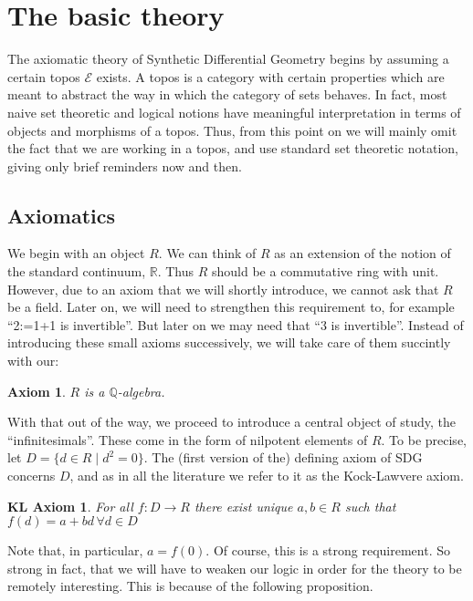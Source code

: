 \documentclass[11pt]{article}
\newtheorem{axiom}{Axiom}[section]
\newtheorem{klaxiom}{KL Axiom}
\theoremstyle{definition}
\newcommand{\sdgE}{\mathcal{E}}
\newcommand{\Q}{\mathbb{Q}}
\numberwithin{equation}{section}
\begin{document}
\section{The basic theory}

The axiomatic theory of Synthetic Differential Geometry begins by assuming a certain topos \( \sdgE \) exists. A topos is a category with certain properties which are meant to abstract the way in which the category of sets behaves. In fact, most naive set theoretic and logical notions have meaningful interpretation in terms of objects and morphisms of a topos. Thus, from this point on we will mainly omit the fact that we are working in a topos, and use standard set theoretic notation, giving only brief reminders now and then. 

\subsection{Axiomatics}

We begin with an object \( R \). We can think of \( R \) as an extension of the notion of the standard continuum, \( \mathbb{R} \). Thus \( R \) should be a commutative ring with unit. However, due to an axiom that we will shortly introduce, we cannot ask that \( R \) be a field. Later on, we will need to strengthen this requirement to, for example ``2:=1+1 is invertible''. But later on we may need that ``3 is invertible''. Instead of introducing these small axioms successively, we will take care of them succintly with our:

\begin{axiom}
  \label{ax0}
  \( R \) is a \( \Q \)-algebra.
\end{axiom}

With that out of the way, we proceed to introduce a central object of study, the ``infinitesimals''. These come in the form of nilpotent elements of \( R \). To be precise, let \( D = \{d\in R \mid d^2=0\} \). The (first version of the) defining axiom of SDG concerns \( D \), and as in all the literature we refer to it as the Kock-Lawvere axiom.

\begin{klaxiom}
  \label{KL1}
  For all \( f:D\to R \) there exist unique \( a,b\in R \) such that \( f(d) = a + bd\,\forall d\in D \)
\end{klaxiom}

Note that, in particular, \( a=f(0) \). Of course, this is a strong requirement. So strong in fact, that we will have to weaken our logic in order for the theory to be remotely interesting. This is because of the following proposition.
\end{document}
